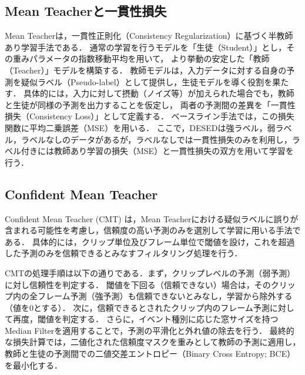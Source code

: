 \documentclass[main]{subfiles}
\begin{document}
\subsection{Mean Teacherと一貫性損失}
Mean Teacherは，一貫性正則化（Consistency Regularization）に基づく半教師あり学習手法である．
通常の学習を行うモデルを「生徒（Student）」とし，その重みパラメータの指数移動平均を用いて，
より挙動の安定した「教師（Teacher）」モデルを構築する．
教師モデルは，入力データに対する自身の予測を疑似ラベル（Pseudo-label）として提供し，生徒モデルを導く役割を果たす．
具体的には，入力に対して摂動（ノイズ等）が加えられた場合でも，教師と生徒が同様の予測を出力することを仮定し，
両者の予測間の差異を「一貫性損失（Consistency Loss）」として定義する．
ベースライン手法では，この損失関数に平均二乗誤差（MSE）を用いる．
ここで，DESEDは強ラベル，弱ラベル，ラベルなしのデータがあるが，ラベルなしでは一貫性損失のみを利用し，ラベル付きには教師あり学習の損失（MSE）と一貫性損失の双方を用いて学習を行う．\par

\subsection{Confident Mean Teacher}
Confident Mean Teacher (CMT) は，Mean Teacherにおける疑似ラベルに誤りが含まれる可能性を考慮し，信頼度の高い予測のみを選別して学習に用いる手法である．
具体的には，クリップ単位及びフレーム単位で閾値を設け，これを超過した予測のみを信頼できるとみなすフィルタリング処理を行う． \par
CMTの処理手順は以下の通りである．まず，クリップレベルの予測（弱予測）に対し信頼性を判定する．
閾値を下回る（信頼できない）場合は，そのクリップ内の全フレーム予測（強予測）も信頼できないとみなし，学習から除外する（値を0とする）．
次に，信頼できるとされたクリップ内のフレーム予測に対して再度，閾値を判定する．
さらに，イベント種別に応じた窓サイズを持つMedian Filterを適用することで，予測の平滑化と外れ値の除去を行う． 
最終的な損失計算では，二値化された信頼度マスクを重みとして教師の予測に適用し，教師と生徒の予測間での二値交差エントロピー（Binary Cross Entropy; BCE）を最小化する．\par
\end{document}
